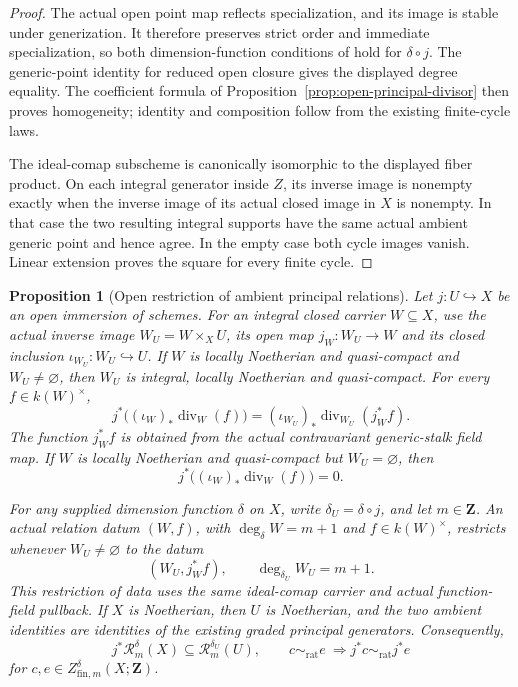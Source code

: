 \documentclass[11pt]{article}
\newtheorem{proposition}[theorem]{Proposition}
\theoremstyle{definition}
\theoremstyle{remark}
\begin{document}
\begin{proof}
The actual open point map reflects specialization, and its image
is stable under generization. It therefore preserves strict order
and immediate specialization, so both dimension-function conditions
of \cite{StacksDimensionFunction} hold for \(\delta\circ j\).
The generic-point identity for reduced open closure gives the
displayed degree equality. The coefficient formula of
Proposition~\ref{prop:open-principal-divisor} then proves homogeneity;
identity and composition follow from the existing finite-cycle laws.

The ideal-comap subscheme is canonically isomorphic to the displayed
fiber product. On each integral generator inside \(Z\), its inverse
image is nonempty exactly when the inverse image of its actual closed
image in \(X\) is nonempty. In that case the two resulting integral
supports have the same actual ambient generic point and hence agree.
In the empty case both cycle images vanish. Linear extension proves
the square for every finite cycle.
\end{proof}

\begin{proposition}[Open restriction of ambient principal relations]
\label{prop:open-principal-relations}
Let \(j:U\hookrightarrow X\) be an open immersion of schemes.
For an integral closed carrier \(W\subseteq X\), use the actual
inverse image \(W_U=W\times_XU\), its open map \(j_W:W_U\to W\)
and its closed inclusion \(\iota_{W_U}:W_U\hookrightarrow U\).
If \(W\) is locally Noetherian and quasi-compact and
\(W_U\ne\varnothing\), then \(W_U\) is integral, locally
Noetherian and quasi-compact. For every \(f\in k(W)^\times\),
\[
 j^*\bigl((\iota_W)_*\operatorname{div}_W(f)\bigr)
    =(\iota_{W_U})_*\operatorname{div}_{W_U}(j_W^*f).
\]
The function \(j_W^*f\) is obtained from the actual contravariant
generic-stalk field map. If \(W\) is locally Noetherian and
quasi-compact but \(W_U=\varnothing\), then
\[
 j^*\bigl((\iota_W)_*\operatorname{div}_W(f)\bigr)=0.
\]

For any supplied dimension function \(\delta\) on \(X\), write
\(\delta_U=\delta\circ j\), and let \(m\in\mathbf Z\).
An actual relation datum \((W,f)\), with
\(\deg_\delta W=m+1\) and \(f\in k(W)^\times\), restricts whenever
\(W_U\ne\varnothing\) to the datum
\[
 (W_U,j_W^*f),\qquad \deg_{\delta_U}W_U=m+1.
\]
This restriction of data uses the same ideal-comap carrier and actual
function-field pullback.
If \(X\) is Noetherian, then \(U\) is Noetherian, and the two
ambient identities are identities of the existing graded principal
generators. Consequently,
\[
 j^*\mathcal R_m^\delta(X)\subseteq\mathcal R_m^{\delta_U}(U),
 \qquad
 c\sim_{\mathrm{rat}}e\ \Longrightarrow
        j^*c\sim_{\mathrm{rat}}j^*e
\]
for \(c,e\in Z^\delta_{\mathrm{fin},m}(X;\mathbf Z)\).
\end{proposition}
\end{document}
